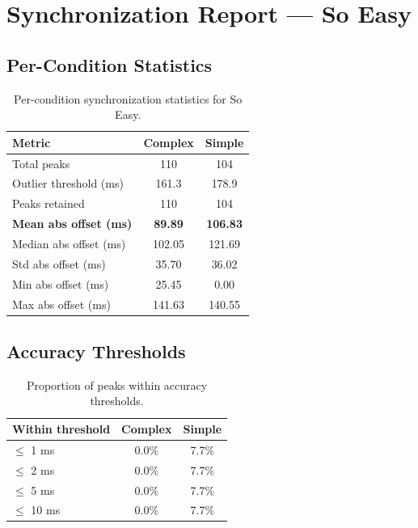 
\section*{Synchronization Report --- So Easy}

\subsection*{Per-Condition Statistics}

\begin{table}[h!]
\centering
\begin{tabular}{|l|c|c|}
\hline
Metric & Complex & Simple \\
\hline
Total peaks & 110 & 104 \\
Outlier threshold (ms) & 161.3 & 178.9 \\
Peaks retained & 110 & 104 \\
\textbf{Mean abs offset (ms)} & \textbf{89.89} & \textbf{106.83} \\
Median abs offset (ms) & 102.05 & 121.69 \\
Std abs offset (ms) & 35.70 & 36.02 \\
Min abs offset (ms) & 25.45 & 0.00 \\
Max abs offset (ms) & 141.63 & 140.55 \\
\hline
\end{tabular}
\caption{Per-condition synchronization statistics for So Easy.}
\label{tab:sync_stats}
\end{table}

\subsection*{Accuracy Thresholds}

\begin{table}[h!]
\centering
\begin{tabular}{|l|c|c|}
\hline
Within threshold & Complex & Simple \\
\hline
$\leq$ 1 ms & 0.0\% & 7.7\% \\
$\leq$ 2 ms & 0.0\% & 7.7\% \\
$\leq$ 5 ms & 0.0\% & 7.7\% \\
$\leq$ 10 ms & 0.0\% & 7.7\% \\
\hline
\end{tabular}
\caption{Proportion of peaks within accuracy thresholds.}
\label{tab:sync_accuracy}
\end{table}

